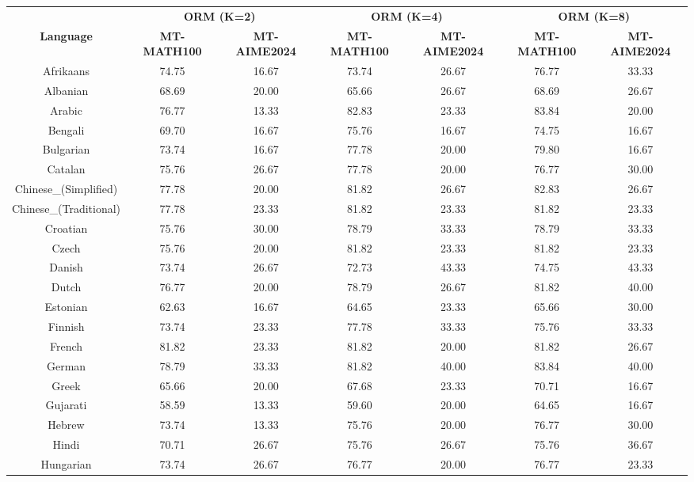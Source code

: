 \begin{table*}[]
\centering
\fontsize{7}{10} \selectfont
\begin{tabular}{c|cc|cc|cc}
\toprule
 & \multicolumn{2}{c|}{\textbf{ORM (K=2)}} & \multicolumn{2}{c|}{\textbf{ORM (K=4)}} & \multicolumn{2}{c}{\textbf{ORM (K=8)}} \\ \cmidrule{2-7}
\multirow{-2}{*}{\textbf{Language}} & \textbf{MT-MATH100} & \textbf{MT-AIME2024} & \textbf{MT-MATH100} & \textbf{MT-AIME2024} & \textbf{MT-MATH100} & \textbf{MT-AIME2024} \\ \midrule
Afrikaans & 74.75 & 16.67 & 73.74 & 26.67 & 76.77 & 33.33 \\
Albanian & 68.69 & 20.00 & 65.66 & 26.67 & 68.69 & 26.67 \\
Arabic & 76.77 & 13.33 & 82.83 & 23.33 & 83.84 & 20.00 \\
Bengali & 69.70 & 16.67 & 75.76 & 16.67 & 74.75 & 16.67 \\
Bulgarian & 73.74 & 16.67 & 77.78 & 20.00 & 79.80 & 16.67 \\
Catalan & 75.76 & 26.67 & 77.78 & 20.00 & 76.77 & 30.00 \\
Chinese\_(Simplified) & 77.78 & 20.00 & 81.82 & 26.67 & 82.83 & 26.67 \\
Chinese\_(Traditional) & 77.78 & 23.33 & 81.82 & 23.33 & 81.82 & 23.33 \\
Croatian & 75.76 & 30.00 & 78.79 & 33.33 & 78.79 & 33.33 \\
Czech & 75.76 & 20.00 & 81.82 & 23.33 & 81.82 & 23.33 \\
Danish & 73.74 & 26.67 & 72.73 & 43.33 & 74.75 & 43.33 \\
Dutch & 76.77 & 20.00 & 78.79 & 26.67 & 81.82 & 40.00 \\
Estonian & 62.63 & 16.67 & 64.65 & 23.33 & 65.66 & 30.00 \\
Finnish & 73.74 & 23.33 & 77.78 & 33.33 & 75.76 & 33.33 \\
French & 81.82 & 23.33 & 81.82 & 20.00 & 81.82 & 26.67 \\
German & 78.79 & 33.33 & 81.82 & 40.00 & 83.84 & 40.00 \\
Greek & 65.66 & 20.00 & 67.68 & 23.33 & 70.71 & 16.67 \\
Gujarati & 58.59 & 13.33 & 59.60 & 20.00 & 64.65 & 16.67 \\
Hebrew & 73.74 & 13.33 & 75.76 & 20.00 & 76.77 & 30.00 \\
Hindi & 70.71 & 26.67 & 75.76 & 26.67 & 75.76 & 36.67 \\
Hungarian & 73.74 & 26.67 & 76.77 & 20.00 & 76.77 & 23.33 \\

\end{tabular}
\end{table*}
